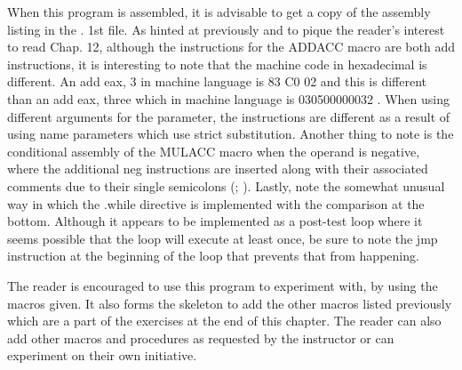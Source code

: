\documentclass[10pt]{article}
\begin{document}
When this program is assembled, it is advisable to get a copy of the assembly listing in the . 1st file. As hinted at previously and to pique the reader's interest to read Chap. 12, although the instructions for the ADDACC macro are both add instructions, it is interesting to note that the machine code in hexadecimal is different. An add eax, 3 in machine language is 83 C0 02 and this is different than an add eax, three which in machine language is 030500000032 . When using different arguments for the parameter, the instructions are different as a result of using name parameters which use strict substitution. Another thing to note is the conditional assembly of the MULACC macro when the operand is negative, where the additional neg instructions are inserted along with their associated comments due to their single semicolons (; ). Lastly, note the somewhat unusual way in which the .while directive is implemented with the comparison at the bottom. Although it appears to be implemented as a post-test loop where it seems possible that the loop will execute at least once, be sure to note the jmp instruction at the beginning of the loop that prevents that from happening.

The reader is encouraged to use this program to experiment with, by using the macros given. It also forms the skeleton to add the other macros listed previously which are a part of the exercises at the end of this chapter. The reader can also add other macros and procedures as requested by the instructor or can experiment on their own initiative.
\end{document}
